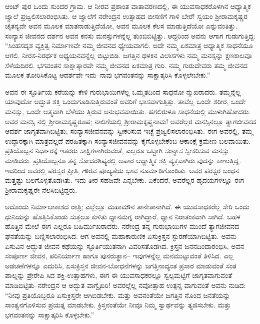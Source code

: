 ಆಂಟ್ ಪುರ ಒಂದು ಸುಂದರ ಗ್ರಾಮ. ಆ ನೀರವ ಪ್ರಶಾಂತ ವಾತಾವರಣದಲ್ಲಿ, ಈ ಯುವಸಾಧಕರೊಳಗಿನ ಆಧ್ಯಾತ್ಮಿಕ ಜ್ವಾಲೆ ಪ್ರಜ್ವಲಿಸಲಾರಂಭಿಸಿತು. ಆ ಜ್ವಾಲೆಗೆ ನರೇಂದ್ರನ ಉತ್ಸಾಹದ ಬೀಸಣಿಗೆ ಗಾಳಿ ಬೇರೆ! ಸ್ವಯಂ ಶ್ರೀರಾಮಕೃಷ್ಣರ ಚೈತನ್ಯವೇ ಅವನ ಮೂಲಕ ಮಾತನಾಡುತ್ತಿದೆಯೋ, ಅವನ ಮೂಲಕ ಕೆಲಸ ಮಾಡುತ್ತಿದೆಯೋ ಎನ್ನುವಂತಿತ್ತು. ಸಂನ್ಯಾಸ ಜೀವನದ ದರ್ಶನ ಅವನ ಕನಸು ಮನಸ್ಸುಗಳನ್ನೆಲ್ಲ ತುಂಬಿಬಿಟ್ಟಿತ್ತು. ಆದ್ದರಿಂದ ಅವನು ಆಗಾಗ ಗುಡುಗುತ್ತಿದ್ದ: “ಸಿಂಹಸದೃಶ ವ್ಯಕ್ತಿತ್ವ ನಿರ್ಮಾಣವೇ ನಮ್ಮ ಜೀವನದ ಧ್ಯೇಯವಾಗಲಿ. ಅದೇ ನಮ್ಮ ಏಕಮಾತ್ರ ಆಧ್ಯಾತ್ಮಿಕ ಸಾಧನೆಯೂ ಆಗಲಿ. ನೀರಸ-ನಿರರ್ಥಕ ಅಧ್ಯಯನವನ್ನೆಲ್ಲ ಬಿಟ್ಟುಬಿಡಿ. ಜಗತ್ತಿನ ಥಳಕಿನ ವಿಲಾಸಗಳು ನಮ್ಮ ಮನಸ್ಸನ್ನು ಕ್ಷಣಕಾಲವೂ ಸೆಳೆಯದಿರಲಿ. ಭಗವಂತನ ಸಾಕ್ಷಾತ್ಕಾರವೇ ನಮ್ಮ ಜೀವನದ ಏಕಮಾತ್ರ ಗುರಿ. ನಮ್ಮ ಗುರುದೇವರು ತಮ್ಮ ಜೀವನದ ಮೂಲಕ ತೋರಿಸಿಕೊಟ್ಟ ಆದರ್ಶವೇ ಇದು–ನಾವು ಭಗವಂತನನ್ನು ಸಾಕ್ಷಾತ್ಕರಿಸಿ ಕೊಳ್ಳಲೇಬೇಕು.”

ಅವನ ಈ ಸ್ಫೂರ್ತಿಯ ಕರೆಯನ್ನು ಕೇಳಿ ಗುರುಭಾಯಿಗಳೆಲ್ಲ ಒಮ್ಮತದಿಂದ ಸಾಧನೋ ನ್ಮುಖರಾದರು. ತಮ್ಮನ್ನೆಲ್ಲ ಯಾವುದೋ ಅದ್ಭುತ ಶಕ್ತಿ ಒಂದುಗೂಡಿಸುತ್ತಿರುವಂತೆ ಅವರಿಗೆ ಭಾಸವಾಗುತ್ತಿತ್ತು. ತಾವೆಲ್ಲ ಒಂದೇ ಶರೀರ, ಒಂದೇ ಮನಸ್ಸು, ಒಂದೇ ಆತ್ಮವಾಗಿ ಬೆಳೆಯು ತ್ತಿರುವ ಅನುಭವವಾಯಿತು. ಹಗಲಿರುಳೂ ಸಾಧನೆಯಲ್ಲಿ ಮುಳುಗಿಹೋದರು. ಅವರ ಮನಸ್ಸಿ ನಲ್ಲಿ ಶ್ರೀರಾಮಕೃಷ್ಣರೂಪ; ನಾಲಿಗೆಯಲ್ಲಿ ಶ್ರೀರಾಮಕೃಷ್ಣನಾಮ! ಅವರೆಲ್ಲರ ಮನಸ್ಸಿನಲ್ಲೂ ತ್ಯಾಗಜೀವನದ ಆದರ್ಶ ಜಾಗೃತವಾಗಿಬಿಟ್ಟಿತು; ಸಂನ್ಯಾಸಜೀವನವನ್ನು ಸ್ವೀಕರಿಸುವ ಇಚ್ಛೆ ಪ್ರಜ್ವಲಿಸಲಾರಂಭಿಸಿತು. ಈಗ ಅವರಲ್ಲಿ, ತಮ್ಮ ಉದ್ಧಾರಕ್ಕಾಗಿ ಮಾತ್ರವಲ್ಲದೆ ಪರಹಿತಕ್ಕಾಗಿ ಸಂನ್ಯಾಸಜೀವನವನ್ನು ಕೈಗೊಳ್ಳಬೇಕೆಂಬ ಆಕಾಂಕ್ಷೆ ಕ್ರಮೇಣ ಬಲವಾಯಿತು. ಪ್ರತಿಯೊಬ್ಬನ ನಿರ್ಧಾರಕ್ಕೆ ಇತರರು ಸಾಕ್ಷಿಗಳಾಗಿರುವಂತೆ, ಎಲ್ಲರೂ ಒಟ್ಟಾಗಿ ಸಂನ್ಯಾಸ ಸ್ವೀಕರಿಸುವ ಮನಸ್ಸು ಮಾಡಿದರು. ಪ್ರತಿಯೊಬ್ಬನೂ ತನ್ನ ಸೋದರಶಿಷ್ಯರಲ್ಲಿ ಅಪಾರ ಆಧ್ಯಾತ್ಮಿಕ ಶಕ್ತಿ ವ್ಯಕ್ತವಾಗಿರು ವುದನ್ನು ಕಾಣುತ್ತಿದ್ದ. ಇದರಿಂದ ಅವರಲ್ಲಿ ಪರಸ್ವರ ಪ್ರೀತಿ, ಗೌರವ ಪೂಜ್ಯತೆಯ ಭಾವ ನೂರ್ಮಡಿಗೊಂಡಿತು. ಅವರ ಪರಸ್ಪರ ಬಂಧನ ಮತ್ತಷ್ಟು ಬಲಗೊಳ್ಳತೊಡಗಿತು. ಇದು ತೀರ ಸಹಜವೇ ಎನ್ನಬೇಕು. ಏಕೆಂದರೆ, ಅವರೆಲ್ಲರ ಹೃದಯಗಳಲ್ಲೂ ಈಗ ಶ್ರೀರಾಮಕೃಷ್ಣರೇ ನೆಲಸಿಬಿಟ್ಟಿದ್ದರು.

ಅದೊಂದು ನಿರ್ಮಾಲಾಕಾಶದ ರಾತ್ರಿ; ಎಲ್ಲೆಲ್ಲೂ ಮಹಾಮೌನ ತಾನೇತಾನಾಗಿದೆ. ಈ ಯುವಸಾಧಕರೆಲ್ಲ ಸೇರಿ ಒಂದು ಧುನಿಯನ್ನು ಹೊತ್ತಿಸಿಕೊಂಡು ಸುತ್ತಲೂ ಕುಳಿತು ಧ್ಯಾನಮಗ್ನ ರಾಗಿದ್ದಾರೆ. ಧ್ಯಾನ ನಿರಾತಂಕವಾಗಿ ಸಾಗಿದೆ. ಬಹಳ ಹೊತ್ತಿನ ಮೇಲೆ ಈಗ ಎಲ್ಲರೂ ಬಹಿರ್ಮುಖರಾದರು. ನರೇಂದ್ರ ತನ್ನ ಗುರುಭಾಯಿಗಳ ಮುಂದೆ ತ್ಯಾಗಜೀವನದ ಘನತೆಯನ್ನು ಬಣ್ಣಿಸಲಾರಂಭಿಸಿದ. ಆಗ ಅವನಲ್ಲಿ ಮಹಾಕಾರುಣಿಕ ಏಸುಕ್ರಿಸ್ತನ ಸ್ಫುರಣೆಯಾಗಿಬಿಟ್ಟಿತು. ಅವನು ಏಸುವಿನ ಅದ್ಭುತ ಜೀವನ ಕಥೆಯನ್ನು ಸ್ಫೂರ್ತಿಯುತನಾಗಿ ವಿವರಿಸತೊಡಗಿದ. ಕ್ರಿಸ್ತನ ಜನನದಿಂದಾರಂಭಿಸಿ, ಅವನ ಸಂಪೂರ್ಣ ಜೀವನ, ಪರಿನಿರ್ಯಾಣ ಹಾಗೂ ಪುನರುತ್ಥಾನ– ಇವುಗಳನ್ನೆಲ್ಲ ಮನಮುಟ್ಟುವಂತೆ ತಿಳಿಸಿದ. ಎಲ್ಲ ಅಡಚಣೆಗಳನ್ನೂ ಎದುರಿಸಿ, ಏಸುಕ್ರಿಸ್ತನ ಜೀವನ-ಬೋಧನೆಗಳನ್ನು ಜಗತ್ತಿನಾದ್ಯಂತ ಪ್ರಸಾರ ಮಾಡುವಂತೆ ಸಂತ ಪಾಲ್ನನ್ನು ಪ್ರೇರೇಪಿ ಸಿದ ಶಕ್ತಿ-ಉತ್ಸಾಹಗಳು, ಈಗ ಈ ಯುವಸಾಧಕರಲ್ಲೂ ಸ್ವಲ್ಪಮಟ್ಟಿಗೆ ಜಾಗೃತವಾಗುವಂತೆ ಮಾಡಿಬಿಟ್ಟಿತು–ನರೇಂದ್ರನ ಆ ಅದ್ಭುತ ವಾಗ್ವೈಖರಿ! ಅವರಲ್ಲೆಲ್ಲ ನವೋತ್ಸಾಹ ಉತ್ಪನ್ನ ವಾಗುವಂತೆ ಅವನು ನುಡಿದ: “ನೀವು ಪ್ರತಿಯೊಬ್ಬರೂ ಏಸುಕ್ರಿಸ್ತರೇ ಆಗಿಬಿಡಬೇಕು. ಮತ್ತು ಅವನಂತೆಯೇ ಜಗತ್ತಿನ ನೊಂದ ಜನತೆಯನ್ನು ಸಾಂತ್ವನಗೊಳಿಸುವ ಪ್ರಯತ್ನ ಮಾಡಬೇಕು. ಕ್ರಿಸ್ತನಂತೆಯೇ ನೀವೂ ನಿಮ್ಮ ಸ್ವಾರ್ಥವನ್ನು ತ್ಯಜಿಸಬೇಕು. ಮತ್ತು ಭಗವಂತನನ್ನು ಸಾಕ್ಷಾತ್ಕರಿಸಿ ಕೊಳ್ಳಬೇಕು.”

